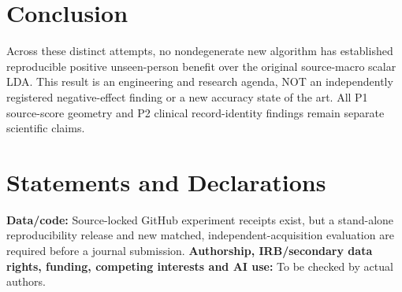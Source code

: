 \documentclass[11pt,a4paper]{article}
\begin{document}
\section{Conclusion}
Across these distinct attempts, no
nondegenerate new algorithm has established
reproducible positive unseen-person benefit
over the original source-macro scalar LDA.
This result is an engineering
and research agenda, NOT an independently
registered negative-effect finding or
a new accuracy state of the art.
All P1 source-score geometry and P2 clinical
record-identity findings remain
separate scientific claims.

\section*{Statements and Declarations}
\textbf{Data/code:} Source-locked GitHub experiment receipts
exist, but a stand-alone reproducibility release and
new matched, independent-acquisition evaluation
are required before a journal submission.
\textbf{Authorship, IRB/secondary data rights,
funding, competing interests and AI use:}
To be checked by actual authors.


\end{document}
